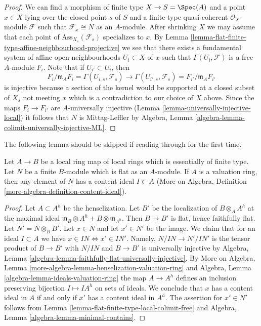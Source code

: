 \begin{proof}
We can find a morphism of finite type $X \to S = \Spec(A)$
and a point $x \in X$ lying over the closed point $s$ of $S$ and a finite
type quasi-coherent $\mathcal{O}_X$-module $\mathcal{F}$ such that
$\mathcal{F}_x \cong N$ as an $A$-module. After shrinking $X$
we may assume that each point of $\text{Ass}_{X_s}(\mathcal{F}_s)$ specializes
to $x$. By
Lemma \ref{lemma-flat-finite-type-affine-neighbourhood-projective}
we see that there exists a fundamental system of affine open neighbourhoods
$U_i \subset X$ of $x$ such that $\Gamma(U_i, \mathcal{F})$ is
a free $A$-module $F_i$. Note that if $U_{i'} \subset U_i$, then
$$
F_i/\mathfrak m_AF_i = \Gamma(U_{i, s}, \mathcal{F}_s)
\longrightarrow
\Gamma(U_{i', s}, \mathcal{F}_s) = F_{i'}/\mathfrak m_AF_{i'}
$$
is injective because a section of the kernel would be supported at
a closed subset of $X_s$ not meeting $x$ which is a contradiction
to our choice of $X$ above. Since the maps $F_i \to F_{i'}$ are
$A$-universally injective (Lemma \ref{lemma-universally-injective-local})
it follows that $N$ is
Mittag-Leffler by
Algebra, Lemma \ref{algebra-lemma-colimit-universally-injective-ML}.
\end{proof}

\noindent
The following lemma should be skipped if reading through for the first time.

\begin{lemma}
\label{lemma-flat-finite-type-local-valuation-ring-has-content}
Let $A \to B$ be a local ring map of local rings which is essentially of
finite type. Let $N$ be a finite $B$-module which is flat as an $A$-module.
If $A$ is a valuation ring, then any element of $N$ has a content ideal
$I \subset A$ (More on Algebra, Definition
\ref{more-algebra-definition-content-ideal}).
\end{lemma}

\begin{proof}
Let $A \subset A^h$ be the henselization. Let $B'$ be the localization
of $B \otimes_A A^h$ at the maximal ideal
$\mathfrak m_B \otimes A^h + B \otimes \mathfrak m_{A^h}$.
Then $B \to B'$ is flat, hence faithfully flat.
Let $N' = N \otimes_B B'$.
Let $x \in N$ and let $x' \in N'$ be the image.
We claim that for an ideal $I \subset A$ we have
$x \in IN \Leftrightarrow x' \in IN'$.
Namely, $N/IN \to N'/IN'$ is the tensor product of $B \to B'$
with $N/IN$ and $B \to B'$ is universally injective by
Algebra, Lemma \ref{algebra-lemma-faithfully-flat-universally-injective}.
By More on Algebra, Lemma \ref{more-algebra-lemma-henselization-valuation-ring}
and Algebra, Lemma \ref{algebra-lemma-ideals-valuation-ring}
the map $A \to A^h$ defines an inclusion preserving
bijection $I \mapsto IA^h$ on sets of ideals. We conclude that
$x$ has a content ideal in $A$ if and only if $x'$ has a content
ideal in $A^h$. The assertion for $x' \in N'$ follows from
Lemma \ref{lemma-flat-finite-type-local-colimit-free} and
Algebra, Lemma \ref{algebra-lemma-minimal-contains}.
\end{proof}





